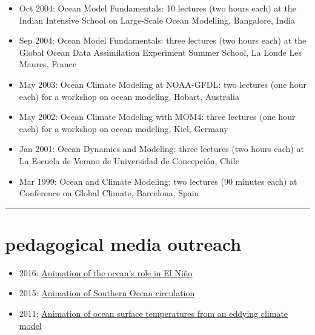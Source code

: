 \begin{itemize}[leftmargin=*]
\item Oct 2004: {\sc Ocean Model Fundamentals}: 10 lectures (two hours each) at the {\sc Indian Intensive School on Large-Scale Ocean Modelling}, Bangalore, India

\item Sep 2004: {\sc Ocean Model Fundamentals}: three lectures (two hours each) at the {\sc Global Ocean Data Assimilation Experiment  Summer School}, La Londe Les Maures, France

\item May 2003: {\sc Ocean Climate Modeling at NOAA-GFDL}: two lectures (one hour each) for a workshop on ocean modeling, Hobart, Australia

\item May 2002: {\sc Ocean Climate Modeling with MOM4}: three lectures (one hour each) for a workshop on ocean modeling, Kiel, Germany

\item Jan 2001: {\sc Ocean Dynamics and Modeling}: three lectures (two hours each) at La Escuela de Verano de Universidad de Concepci\'on, Chile

\item Mar 1999: {\sc Ocean and Climate Modeling}: two lectures (90 minutes each) at {\sc Conference on Global Climate}, Barcelona,
Spain

\end{itemize}


\noindent\rule{\textwidth}{1pt}
\vspace{-1cm}
\section*{\sc  \color{Maroon} pedagogical media outreach}
\vspace{-.3cm}

\begin{itemize}[leftmargin=*]

\item 2016: \href{https://www.youtube.com/watch?v=gaFjlZxM7S4&feature=youtu.be}{Animation of  the ocean's role in El Ni\~{n}o} 

\item 2015:  \href{https://www.youtube.com/watch?v=8VMSF28J9H4&list=PL9poquLHLLO91iC_6pujn6bsMCvMyJ3xU}{Animation  of  Southern Ocean circulation} 

\item 2011:  \href{https://vimeo.com/27076776}{Animation  of  ocean surface temperatures from an eddying climate model} 

\end{itemize}



